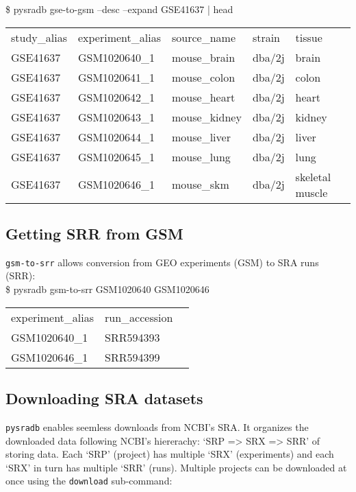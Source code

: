 \documentclass[9pt,a4paper]{extarticle}
\newenvironment{allintypewriter}{\ttfamily}{\par}
\begin{document}
\begin{allintypewriter}
\$ pysradb gse-to-gsm --desc --expand GSE41637 | head
\begin{table}[H]
    \begin{tabular}{lllll}
        study_alias & experiment_alias & source_name &  strain & tissue\\
        GSE41637 & GSM1020640_1 &  mouse_brain &  dba/2j & brain\\
        GSE41637 & GSM1020641_1 &  mouse_colon &  dba/2j & colon\\
        GSE41637 & GSM1020642_1 &  mouse_heart &  dba/2j & heart\\
        GSE41637 & GSM1020643_1 &  mouse_kidney & dba/2j & kidney\\
        GSE41637 & GSM1020644_1 &  mouse_liver &  dba/2j & liver\\
        GSE41637 & GSM1020645_1 &  mouse_lung & dba/2j & lung\\
        GSE41637 & GSM1020646_1 &  mouse_skm & dba/2j & skeletal muscle\\
    \end{tabular}
\end{table}
\end{allintypewriter}

\subsection*{Getting SRR from GSM}
\texttt{gsm-to-srr} allows conversion from GEO experiments (GSM) to
SRA runs (SRR):\\

\begin{allintypewriter}
\$ pysradb gsm-to-srr  GSM1020640 GSM1020646
\begin{table}[H]
    \begin{tabular}{lll}
experiment_alias & run_accession\\
GSM1020640_1 & SRR594393\\
GSM1020646_1 & SRR594399\\
\end{tabular}
\end{table}
\end{allintypewriter}

\subsection*{Downloading SRA datasets}

\texttt{pysradb} enables seemless downloads from NCBI's SRA. It organizes
the downloaded data following NCBI's hiererachy: `SRP => SRX => SRR' of storing data.
Each `SRP' (project) has multiple `SRX' (experiments) and each `SRX' in turn 
has multiple `SRR' (runs).  Multiple projects can be downloaded at once using
the \texttt{download} sub-command:\\
\end{document}
